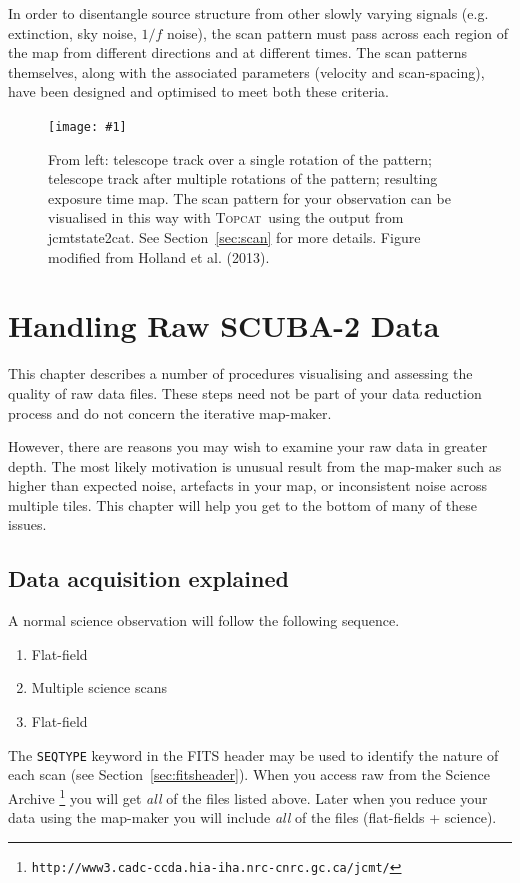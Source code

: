 \documentclass[twoside,11pt]{article}
\newcommand{\htmladdnormallink}[2]{#1}
\newcommand{\htmladdimg}[1]{}
\newcommand{\htmlref}[2]{#1}
\newenvironment{latexonly}{}{}
\newcommand{\latexhtml}[2]{#1}
\newcommand{\xref}[3]{#1}
\newcommand{\xlabel}[1]{}
\renewcommand{\_}{\texttt{\symbol{95}}}
\newcommand{\topcat}{\htmladdnormallink{\textsc{Topcat}}{http://www.starlink.ac.uk/topcat}}
\newcommand{\task}[1]{\textsf{#1}}
\newcommand{\param}[1]{\texttt{#1}}
\newcommand{\url}[1]{\texttt{#1}}
\newcommand{\jcmtstate}{\xref{\task{jcmtstate2cat}}{sun258}{JCMTSTATE2CAT}}
\newcommand{\myfig}[6]{
  \begin{figure}#2
    \centering\texttt{[image: \#1]}
    \typeout{#1 inserted on page \arabic{page}}
    \caption[#5]{\label{#4}\small #6}
  \end{figure}
}
\newcommand{\myfig}[6]{
    \label{#4} \htmladdimg{#1.png}\\
    \\
    Figure: #6\\
  }
\newcommand{\cref}[3]{\latexhtml{#1~\ref{#2}}{\htmlref{#3}{#2}}}
\begin{document}
In order to disentangle source structure from other
slowly varying signals (e.g. extinction, sky noise, $1/f$ noise), the
scan pattern must pass across each region of the map from different
directions and at different times. The scan patterns themselves, along
with the associated parameters (velocity and scan-spacing), have been
designed and optimised to meet both these criteria.

\myfig{sc21_wayne_scan}{[t!]}{width=0.98\linewidth}{fig:scan}{
  Illustration of the SCUBA-2 observing patterns}{
  From left: telescope track over a single rotation of the pattern;
  telescope track after multiple rotations of the pattern; resulting
  exposure time map. The scan pattern for your observation can be
  visualised in this way with \topcat\ using the output from
  \jcmtstate.  See \cref{Section}{sec:scan}{Displaying scan patterns} for
  more details.  Figure modified from Holland et al. (2013).
}

\clearpage

\section{\xlabel{data_files}Handling Raw SCUBA-2 Data}
\label{sec:raw}

This chapter describes a number of procedures visualising
and assessing the quality of raw data files.  These steps need not be part of
your data reduction process and do not concern the iterative map-maker.

However, there are reasons you may wish to examine your raw data in
greater depth. The most likely motivation is unusual result from the
map-maker such as higher than expected noise, artefacts in your map, or
inconsistent noise across multiple tiles.  This chapter will help you
get to the bottom of many of these issues.

\subsection{Data acquisition explained}
A normal science observation will follow the following sequence.
\vspace{-2mm}
\begin{enumerate}\itemsep-0.2em
\item Flat-field
\item Multiple science scans
\item Flat-field
\end{enumerate}
\vspace{-2mm}
The \param{SEQ\_TYPE} keyword in the FITS header may be used to
identify the nature of each scan (see
\cref{Section}{sec:fitsheader}{Headers and file structure}).
When you access raw from the \htmladdnormallink{Science Archive}{http://www3.cadc-ccda.hia-iha.nrc-cnrc.gc.ca/jcmt/}
\begin{latexonly}
\hspace{-0.5em}\footnote{\url{http://www3.cadc-ccda.hia-iha.nrc-cnrc.gc.ca/jcmt/}}
\end{latexonly}
you will get \emph{all} of the files listed above. Later when you
reduce your data using the map-maker you will include \emph{all} of
the files (flat-fields + science).
\end{document}
